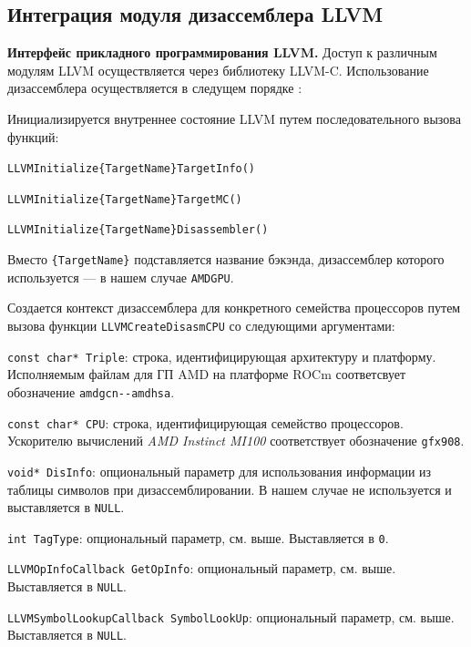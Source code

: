 \documentclass[a4paper,14pt]{extarticle}
\newcommand{\topic}[1]{\textbf{#1.}}
\begin{document}
{\begin{ol}
\end{ol}

\subsection{Интеграция модуля дизассемблера LLVM}
\label{section:impl-disasm}

\topic{Интерфейс прикладного программирования LLVM} Доступ к различным модулям LLVM
осуществляется через библиотеку LLVM-C. Использование дизассемблера осуществляется
в следущем порядке \cite{llvm-c}:
\begin{ol}
\item Инициализируется внутреннее состояние LLVM путем последовательного
вызова функций:
  \begin{ol}
  \item \verb|LLVMInitialize{TargetName}TargetInfo()|
  \item \verb|LLVMInitialize{TargetName}TargetMC()|
  \item \verb|LLVMInitialize{TargetName}Disassembler()|
  \end{ol}
Вместо \verb|{TargetName}| подставляется название бэкэнда, дизассемблер которого
используется — в нашем случае \verb|AMDGPU|.

\item Создается контекст дизассемблера для конкретного семейства процессоров
путем вызова функции \verb|LLVMCreateDisasmCPU| со следующими аргументами:
  \begin{ol}
  \item \verb|const char* Triple|: строка, идентифицирующая архитектуру и платформу.
Исполняемым файлам для ГП AMD на платформе ROCm соответсвует обозначение \verb|amdgcn--amdhsa|.
  \item \verb|const char* CPU|: строка, идентифицирующая семейство процессоров.
Ускорителю вычислений \textit{AMD Instinct MI100} соответствует обозначение \verb|gfx908|.
  \item \verb|void* DisInfo|: опциональный параметр для использования информации из таблицы
символов при дизассемблировании. В нашем случае не используется и выставляется в \verb|NULL|.
  \item \verb|int TagType|: опциональный параметр, см. выше. Выставляется в \verb|0|.
  \item \verb|LLVMOpInfoCallback GetOpInfo|: опциональный параметр, см. выше. Выставляется в \verb|NULL|.
  \item \verb|LLVMSymbolLookupCallback SymbolLookUp|: опциональный параметр, см. выше. Выставляется в \verb|NULL|. 
  \end{ol}


\end{ol}}
\end{document}
